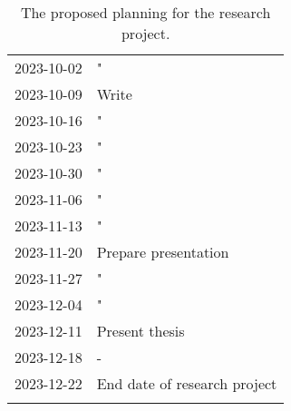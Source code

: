 \documentclass{article}
\theoremstyle{plain}%
\theoremstyle{definition}
\begin{document}
\begin{longtable}{l l}
2023-10-02 & "                                                              \\
2023-10-09 & Write                                                                  \\
2023-10-16 & "                                                                  \\
2023-10-23 & "                                                                  \\
2023-10-30 & "                                                                  \\
2023-11-06 & "                                                                  \\
2023-11-13 & "                                                                  \\
2023-11-20 & Prepare presentation                                               \\
2023-11-27 & "                                                                  \\
2023-12-04 & "                                                                  \\
2023-12-11 & Present thesis                                                     \\
2023-12-18 & -                                                                  \\
2023-12-22 & End date of research project                                       \\
\caption{The proposed planning for the research project.}
\end{longtable}
\end{document}
